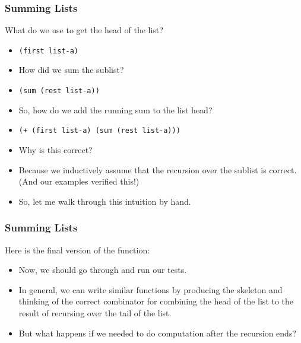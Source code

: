 \documentclass{beamer}
\begin{document}
\begin{frame}
  \frametitle{Summing Lists}
  What do we use to get the head of the list?
  \begin{itemize}
  \item<2-> \texttt{(first list-a)}
  \item<3-> How did we sum the sublist?
  \item<4-> \texttt{(sum (rest list-a))}
  \item<5-> So, how do we add the running sum to the list head?
  \item<6->  \texttt{(+ (first list-a) (sum (rest list-a)))}
  \item<7-> Why is this correct?
  \item<8-> Because we inductively assume that the recursion over
    the sublist is correct. (And our examples verified this!)
  \item<9-> So, let me walk through this intuition by hand.
  \end{itemize}
\end{frame}


\begin{frame}
  \frametitle{Summing Lists}
  Here is the final version of the function:
  \SumFinal
  \begin{itemize}
  \item<2-> Now, we should go through and run our tests.
  \item<3-> In general, we can write similar functions by
    producing the skeleton and thinking of the correct combinator
    for combining the head of the list to the result of recursing
    over the tail of the list.
  \item<4-> But what happens if we needed to do computation after
    the recursion ends?
  \end{itemize}
\end{frame}

\end{document}
